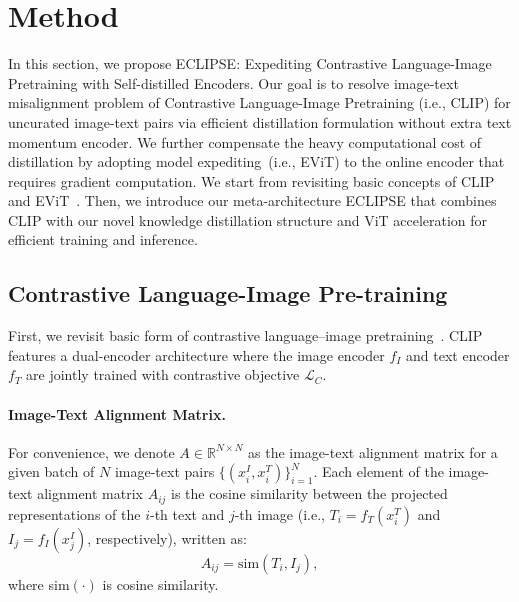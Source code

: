 
\section{Method}
\label{sec:method}

In this section, we propose ECLIPSE: Expediting Contrastive Language-Image Pretraining with Self-distilled Encoders.
Our goal is to resolve image-text misalignment problem of Contrastive Language-Image Pretraining (i.e., CLIP) for uncurated image-text pairs via efficient distillation formulation without extra text momentum encoder.
We further compensate the heavy computational cost of distillation by adopting model expediting~(i.e., EViT) to the online encoder that requires gradient computation.
We start from revisiting basic concepts of CLIP and EViT~\cite{liang2022evit}.
Then, we introduce our meta-architecture ECLIPSE that combines CLIP with our novel knowledge distillation structure and ViT acceleration for efficient training and inference.

\subsection{Contrastive Language-Image Pre-training}

First, we revisit basic form of contrastive language--image pretraining~\cite{radford2021learning}.
CLIP features a dual-encoder architecture where the image encoder $f_I$ and text encoder $f_T$ are jointly trained with contrastive objective $\mathcal{L}_{C}$.

\paragraph{Image-Text Alignment Matrix.}
For convenience, we denote $A\in\mathbb{R}^{N\times N}$ as the image-text alignment matrix for a given batch of $N$ image-text pairs $\{(x_i^I,x_i^T)\}_{i=1}^N$.
Each element of the image-text alignment matrix $A_{ij}$ is the cosine similarity between the projected representations of the $i$-th text and $j$-th image (i.e., $T_i=f_T(x^T_i)$ and $I_j=f_I(x^I_j)$, respectively), written as:
\begin{equation}
\label{eq:align}
    A_{ij}=\mbox{sim}(T_i, I_j), %
\end{equation}
where sim$(\cdot)$ is cosine similarity.

